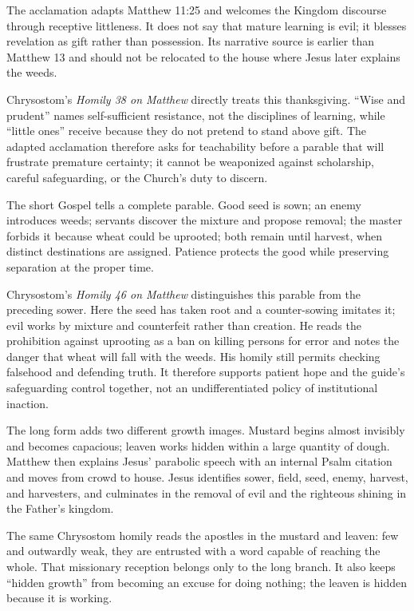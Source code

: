 \begin{deepstudy}
The acclamation adapts Matthew 11:25 and welcomes the Kingdom discourse through receptive littleness. It does not say that mature learning is evil; it blesses revelation as gift rather than possession. Its narrative source is earlier than Matthew 13 and should not be relocated to the house where Jesus later explains the weeds.

Chrysostom's \emph{Homily 38 on Matthew} directly treats this thanksgiving. “Wise and prudent” names self-sufficient resistance, not the disciplines of learning, while “little ones” receive because they do not pretend to stand above gift. The adapted acclamation therefore asks for teachability before a parable that will frustrate premature certainty; it cannot be weaponized against scholarship, careful safeguarding, or the Church's duty to discern.

The short Gospel tells a complete parable. Good seed is sown; an enemy introduces weeds; servants discover the mixture and propose removal; the master forbids it because wheat could be uprooted; both remain until harvest, when distinct destinations are assigned. Patience protects the good while preserving separation at the proper time.

Chrysostom's \emph{Homily 46 on Matthew} distinguishes this parable from the preceding sower. Here the seed has taken root and a counter-sowing imitates it; evil works by mixture and counterfeit rather than creation. He reads the prohibition against uprooting as a ban on killing persons for error and notes the danger that wheat will fall with the weeds. His homily still permits checking falsehood and defending truth. It therefore supports patient hope and the guide's safeguarding control together, not an undifferentiated policy of institutional inaction.

The long form adds two different growth images. Mustard begins almost invisibly and becomes capacious; leaven works hidden within a large quantity of dough. Matthew then explains Jesus' parabolic speech with an internal Psalm citation and moves from crowd to house. Jesus identifies sower, field, seed, enemy, harvest, and harvesters, and culminates in the removal of evil and the righteous shining in the Father's kingdom.

The same Chrysostom homily reads the apostles in the mustard and leaven: few and outwardly weak, they are entrusted with a word capable of reaching the whole. That missionary reception belongs only to the long branch. It also keeps “hidden growth” from becoming an excuse for doing nothing; the leaven is hidden because it is working.


\end{deepstudy}
